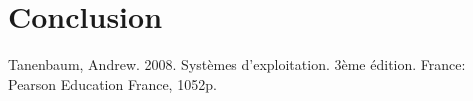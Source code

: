 \documentclass{article}
\begin{document}
\section{Conclusion}

\begin{thebibliography}{9}
Tanenbaum, Andrew. 2008. Systèmes d'exploitation. 3ème édition. France: Pearson Education France, 1052p.
\end{thebibliography}
\end{document}

